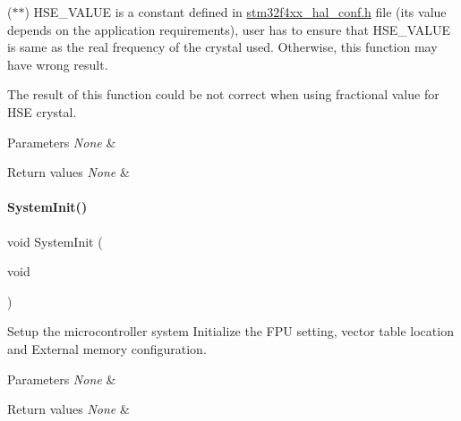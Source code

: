($\ast$$\ast$) H\+S\+E\+\_\+\+V\+A\+L\+UE is a constant defined in \hyperlink{stm32f4xx__hal__conf_8h}{stm32f4xx\+\_\+hal\+\_\+conf.\+h} file (its value depends on the application requirements), user has to ensure that H\+S\+E\+\_\+\+V\+A\+L\+UE is same as the real frequency of the crystal used. Otherwise, this function may have wrong result.


\begin{DoxyItemize}
\item The result of this function could be not correct when using fractional value for H\+SE crystal.
\end{DoxyItemize}


\begin{DoxyParams}{Parameters}
{\em None} & \\
\hline
\end{DoxyParams}

\begin{DoxyRetVals}{Return values}
{\em None} & \\
\hline
\end{DoxyRetVals}
\mbox{\label{group___s_t_m32_f4xx___system___private___functions_ga93f514700ccf00d08dbdcff7f1224eb2}} 
\paragraph{\texorpdfstring{System\+Init()}{SystemInit()}}
{\footnotesize\ttfamily void System\+Init (\begin{DoxyParamCaption}\item[{void}]{ }\end{DoxyParamCaption})}



Setup the microcontroller system Initialize the F\+PU setting, vector table location and External memory configuration. 


\begin{DoxyParams}{Parameters}
{\em None} & \\
\hline
\end{DoxyParams}

\begin{DoxyRetVals}{Return values}
{\em None} & \\
\hline
\end{DoxyRetVals}
